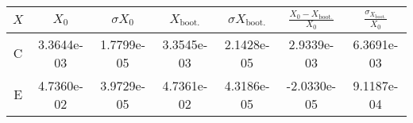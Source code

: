 \documentclass[10pt]{article}
\begin{document}
\begin{center}
\begin{tabular}{ccccccc}
  \(X\)&\(X_0\)&\(\sigma X_0\)&\(X_\text{boot.}\)&\(\sigma X_\text{boot.}\)&\(\frac{X_0 - X_\text{boot.}}{X_0}\)&\(\frac{\sigma_{X_\text{boot.}}}{X_0}\)\\
  \hline
  C & 3.3644e-03 & 1.7799e-05 & 3.3545e-03 & 2.1428e-05 & 2.9339e-03 & 6.3691e-03\\
  E & 4.7360e-02 & 3.9729e-05 & 4.7361e-02 & 4.3186e-05 & -2.0330e-05 & 9.1187e-04
\end{tabular}
\label{Tab:1.1}
\end{center}
\end{document}
